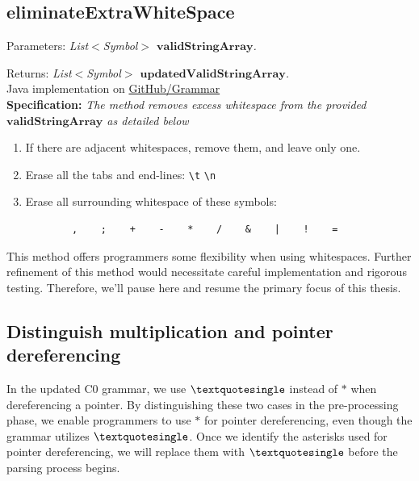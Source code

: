 \vspace{10pt}

\subsection{eliminateExtraWhiteSpace}

Parameters: \textit{List\(<\)Symbol\(>\) \(\boldsymbol{validStringArray}\).}

Returns: \textit{List\(<\)Symbol\(>\) \(\boldsymbol{updatedValidStringArray}\).}\\

Java implementation on \href{https://github.com/fyfsb/dcfg/blob/main/src/main/java/grammar/Grammar.java}{GitHub/Grammar}\\

\textbf{Specification:} \textit{The method removes excess whitespace from the provided \(\boldsymbol{validStringArray}\) as detailed below}\\

\begin{enumerate}
    \item If there are adjacent whitespaces, remove them, and leave only one.
    \item Erase all the tabs and end-lines: \texttt{\textbackslash  t} \texttt{\textbackslash  n}
    \item Erase all surrounding whitespace of these symbols:
    \begin{verbatim}
        ,    ;    +    -    *    /    &    |    !    =
    \end{verbatim}
\end{enumerate}

This method offers programmers some flexibility when using whitespaces. Further refinement of this method would necessitate careful implementation and rigorous testing. Therefore, we'll pause here and resume the primary focus of this thesis.

\vspace{30pt}

\subsection{Distinguish multiplication and pointer dereferencing}

In the updated C0 grammar, we use \(\textquotesingle\) instead of \(\ast\) when dereferencing a pointer. By distinguishing these two cases in the pre-processing phase, we enable programmers to use \(\ast\) for pointer dereferencing, even though the grammar utilizes \(\textquotesingle\). Once we identify the asterisks used for pointer dereferencing, we will replace them with \(\textquotesingle\) before the parsing process begins. \\

